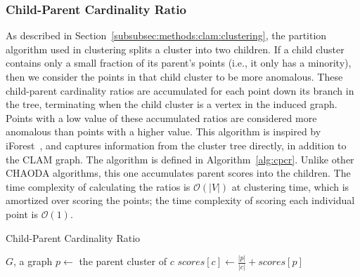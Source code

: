 \subsubsection{Child-Parent Cardinality Ratio}
\label{subsubsec:methods:individual-algorithms:cpcr}
As described in Section~\ref{subsubsec:methods:clam:clustering}, the partition algorithm used in clustering splits a cluster into two children.
If a child cluster contains only a small fraction of its parent's points (i.e., it only has a minority), then we consider the points in that child cluster to be more anomalous.
These child-parent cardinality ratios are accumulated for each point down its branch in the tree, terminating when the child cluster is a vertex in the induced graph.
Points with a low value of these accumulated ratios are considered more anomalous than points with a higher value.
This algorithm is inspired by iForest~\cite{tony2008iforest}, and captures information from the cluster tree directly, in addition to the CLAM graph.
The algorithm is defined in Algorithm~\ref{alg:cpcr}.
Unlike other CHAODA algorithms, this one accumulates parent scores into the children.
The time complexity of calculating the ratios is $\mathcal{O}(|V|)$ at clustering time, which is amortized over scoring the points;
the time complexity of scoring each individual point is $\mathcal{O}(1)$.

\begin{algorithm}[h]
    \caption{Child-Parent Cardinality Ratio}
    \label{alg:cpcr}
\begin{algorithmic}[1]
    \REQUIRE $G$, a graph
        \STATE $p \gets$ the parent cluster of $c$
        \STATE $scores[c] \gets \frac{|p|}{|c|} + scores[p]$
    \ENDFOR
\end{algorithmic}
\end{algorithm}

